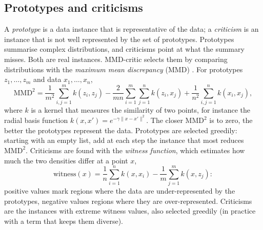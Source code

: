 \subsection{Prototypes and criticisms\extsec}

A \emph{prototype} is a data instance that is representative of the data; a \emph{criticism} is an
instance that is not well represented by the set of prototypes. Prototypes summarise complex
distributions, and criticisms point at what the summary misses. Both are real instances.
MMD-critic \citep{kim2016examples} selects them by comparing distributions with the \emph{maximum mean
discrepancy} (MMD) \citep{gretton2012kernel}. For prototypes $z_1,\dots,z_m$ and data $x_1,\dots,x_n$,
\begin{equation}
  \mathrm{MMD}^2=\frac{1}{m^2}\sum_{i,j=1}^{m}k(z_i,z_j)-\frac{2}{mn}\sum_{i=1}^{m}\sum_{j=1}^{n}k(z_i,x_j)
                +\frac{1}{n^2}\sum_{i,j=1}^{n}k(x_i,x_j),
\end{equation}
where $k$ is a kernel that measures the similarity of two points, for instance the radial basis
function $k(x,x')=e^{-\gamma\|x-x'\|^2}$. The closer $\mathrm{MMD}^2$ is to zero, the better the
prototypes represent the data. Prototypes are selected greedily: starting with an empty list, add at each
step the instance that most reduces $\mathrm{MMD}^2$. Criticisms are found with the \emph{witness
function}, which estimates how much the two densities differ at a point $x$,
\begin{equation}
  \mathrm{witness}(x)=\frac1n\sum_{i=1}^{n}k(x,x_i)-\frac1m\sum_{j=1}^{m}k(x,z_j):
\end{equation}
positive values mark regions where the data are under-represented by the prototypes, negative values
regions where they are over-represented. Criticisms are the instances with extreme witness values, also
selected greedily (in practice with a term that keeps them diverse).

